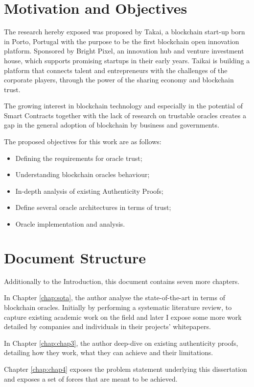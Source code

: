 \section{Motivation and Objectives} \label{sec:goals}
The research hereby exposed was proposed by Takai, a blockchain start-up born in Porto, Portugal with the purpose to be the first blockchain open innovation platform. Sponsored by Bright Pixel, an innovation hub and venture investment house, which supports promising startups in their early years. Taikai is building a platform that connects talent and entrepreneurs with the challenges of the corporate players, through the power of the sharing economy and blockchain trust.

The growing interest in blockchain technology and especially in the potential of Smart Contracts together with the lack of research on trustable oracles creates a gap in the general adoption of blockchain by business and governments.

The proposed objectives for this work are as follows:
\begin{itemize}
  \item Defining the requirements for oracle trust;
  \item Understanding blockchain oracles behaviour;
  \item In-depth analysis of existing Authenticity Proofs;
  \item Define several oracle architectures in terms of trust;
  \item Oracle implementation and analysis.
\end{itemize}

\section{Document Structure} \label{sec:struct}

Additionally to the Introduction, this document contains seven more chapters.

In Chapter \ref{chap:sota}, the author analyse the state-of-the-art in terms of blockchain oracles. Initially by performing a systematic literature review, to capture existing academic work on the field and later I expose some more work detailed by companies and individuals in their projects' whitepapers.

In Chapter \ref{chap:chap3}, the author deep-dive on existing authenticity proofs, detailing how they work, what they can achieve and their limitations.

Chapter \ref{chap:chap4} exposes the problem statement underlying this dissertation and exposes a set of forces that are meant to be achieved.

